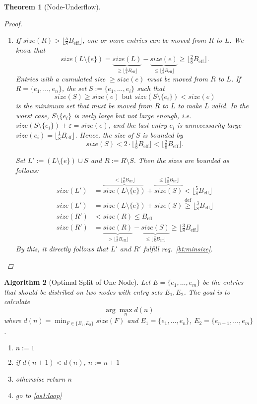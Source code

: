 \documentclass[a4paper, 9pt]{scrartcl}
\theoremstyle{plain}
\newtheorem{thm}{Theorem}[section]
\newtheorem{algo}[thm]{Algorithm}
\theoremstyle{definition}
\theoremstyle{remark}
\newcommand{\Beff}{ B_{\text{eff}} }
\begin{document}
\begin{multicols}{2}
\begin{thm}[Node-Underflow]
\begin{proof}
\begin{enumerate}
\item
If \mbox{$size(R) > \lfloor \tfrac{5}{8} \Beff \rfloor$}, one or more entries
can be moved from $R$ to $L$.
We know that
\[ size(L \setminus \{e\})
= \underbrace{size(L)}_{\geq \lfloor \tfrac{3}{8} \Beff \rfloor}
	- \underbrace{size(e)}_{\leq \lfloor \tfrac{1}{8} \Beff \rfloor}
\geq \lfloor \tfrac{2}{8} \Beff \rfloor. \]
Entries with a cumulated size \mbox{$\geq size(e)$} must be moved from 
$R$ to $L$.
If \mbox{$R = \{e_1, \ldots, e_n\}$}, the set \mbox{$S := \{e_1, \ldots, e_i\}$}
such that
\[ size(S) \geq size(e) \text{ but } size(S \setminus \{e_i\}) < size(e) \]
is the minimum set that must be moved from $R$ to $L$ to make $L$ valid.
In the worst case, \mbox{$S \setminus \{e_i\}$} is verly large but not large
enough, i.e.  \mbox{$size(S \setminus \{e_i\}) + \varepsilon = size(e)$}, and
the last entry $e_i$ is unnecessarily large
\mbox{$size(e_i) = \lfloor \tfrac{1}{8} \Beff \rfloor$}.
Hence, the size of $S$ is bounded by
\[ size(S) < 2 \cdot \lfloor \tfrac{1}{8} \Beff \rfloor
< \lfloor \tfrac{2}{8} \Beff \rfloor. \]

Set \mbox{$L' := (L \setminus \{e\}) \cup S$} and \mbox{$R := R \setminus S$}.
Then the sizes are bounded as follows:
\begin{align*}
size(L') &= \overbrace{size(L \setminus \{e\})}^{
			< \lfloor \frac{3}{8} \Beff \rfloor}
		+ \overbrace{size(S)}^{\leq \lfloor \frac{2}{8} \Beff \rfloor}
	< \lfloor \tfrac{5}{8} \Beff \rfloor\\
size(L') &= size(L \setminus \{e\}) + size(S)
	\stackrel{\mathrm{def}}{\geq} \lfloor \tfrac{3}{8} \Beff \rfloor\\
size(R') &< size(R) \leq \Beff\\
size(R') &= \underbrace{size(R)}_{> \lfloor \tfrac{5}{8} \Beff \rfloor}
		- \underbrace{size(S)}_{\leq \lfloor \tfrac{2}{8} \Beff \rfloor}
	\geq \lfloor \tfrac{3}{8} \Beff \rfloor
\end{align*}
By this, it directly follows that $L'$ and $R'$ fulfill req.~\ref{bt:minsize}.
\end{enumerate}
\end{proof}
\end{thm}


\begin{algo}[Optimal Split of One Node]
Let \mbox{$E = \{ e_1, \ldots, e_m \}$} be the entries that should be
distribed on two nodes with entry sets $E_1, E_2$.
The goal is to calculate
\[ \arg \max_{n} d(n) \]
where
\mbox{$d(n) = \min_{F \in \{E_1, E_2\}} size(F)$}
and \mbox{$E_1 = \{e_1, \ldots, e_n\}$},
\mbox{$E_2 = \{e_{n+1}, \ldots, e_m\}$}.
\begin{enumerate}
\item \mbox{$n := 1$}
\item \label{os1:loop} if \mbox{$d(n+1) < d(n)$},  \mbox{$n := n + 1$} 
\item otherwise return $n$
\item go to \ref{os1:loop}
\end{enumerate}


\end{algo}
\end{multicols}
\end{document}
